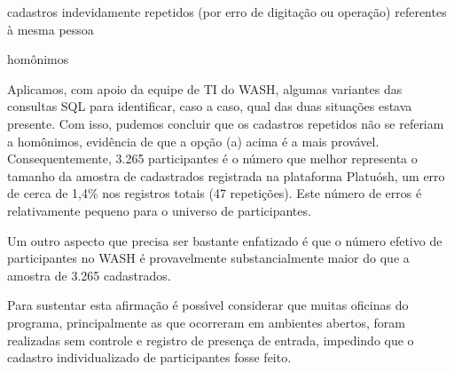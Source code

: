 \documentclass[
12pt,		%
openright,	%
twoside,  %
a4paper,			%
chapter=TITLE,		%
english,			%
french,				%
spanish,			%
brazil				%
]{USPSC-classe/USPSC}
\begin{document}
\begin{alineas}
\item cadastros indevidamente repetidos (por erro de digita\c{c}\~ao ou opera\c{c}\~ao) referentes \`a mesma pessoa
\item hom\^onimos
\end{alineas}

Aplicamos, com apoio da equipe de TI do WASH, algumas variantes das consultas SQL para identificar, caso a caso, qual das duas situa\c{c}\~oes estava presente. Com isso, pudemos concluir que os cadastros repetidos n\~ao se referiam a hom\^onimos, evid\^encia de que a op\c{c}\~ao (a) acima \'e a mais prov\'avel. Consequentemente, 3.265 participantes \'e o n\'umero que melhor representa o tamanho da amostra de cadastrados registrada na plataforma Platu\'osh, um erro de cerca de 1,4\% nos registros totais (47 repeti\c{c}\~oes). Este n\'umero de erros \'e relativamente pequeno para o universo de participantes.


















\noindent\begin{center}\mbox{\centering{}}\end{center}


Um outro aspecto que precisa ser bastante enfatizado \'e que o n\'umero efetivo de participantes no WASH \'e provavelmente substancialmente maior do que a amostra de 3.265 cadastrados.

















Para sustentar esta afirma\c{c}\~ao \'e poss\'{\i}vel considerar que muitas oficinas do programa, principalmente as que ocorreram em ambientes abertos, foram realizadas sem controle e registro de presen\c{c}a  de entrada, impedindo que o cadastro individualizado de participantes fosse feito.
\end{document}
